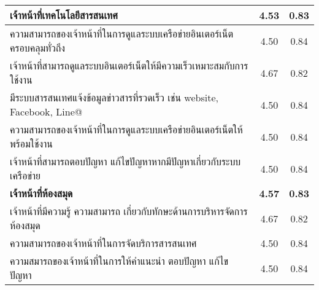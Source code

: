 \begin{longtable}{|>{\raggedright}p{9cm}|c|c|}
		\textbf{เจ้าหน้าที่เทคโนโลยีสารสนเทศ}                                                                                                                                         & \textbf{4.53}                            & \textbf{0.83}          \\ \hline
		ความสามารถของเจ้าหน้าที่ในการดูแลระบบเครือข่ายอินเตอร์เน็ตครอบคลุมทั่วถึง                                                                                                     & 4.50                            & 0.84          \\ \hline
		เจ้าหน้าที่สามารถดูแลระบบอินเตอร์เน็ตให้มีความเร็วเหมาะสมกับการใช้งาน                                                                                                         & 4.67                            & 0.82          \\ \hline
		มีระบบสารสนเทศแจ้งข้อมูลข่าวสารที่รวดเร็ว เช่น website, Facebook, Line@                                                                                                       & 4.50                            & 0.84          \\ \hline
		ความสามารถของเจ้าหน้าที่ในการดูแลระบบเครือข่ายอินเตอร์เน็ตให้พร้อมใช้งาน                                                                                                      & 4.50                            & 0.84          \\ \hline
		เจ้าหน้าที่สามารถตอบปัญหา แก้ไขปัญหาหากมีปัญหาเกี่ยวกับระบบเครือข่าย                                                                                                          & 4.50                            & 0.84          \\ \hline
		\textbf{เจ้าหน้าที่ห้องสมุด}                                                                                                                                                  & \textbf{4.57}                            & \textbf{0.83}          \\ \hline
		เจ้าหน้าที่มีความรู้ ความสามารถ เกี่ยวกับทักษะด้านการบริหารจัดการห้องสมุด                                                                                                     & 4.67                            & 0.82          \\ \hline
		ความสามารถของเจ้าหน้าที่ในการจัดบริการสารสนเทศ                                                                                                                                & 4.50                            & 0.84          \\ \hline
		ความสมารถของเจ้าหน้าที่ในการให้คำแนะนำ ตอบปัญหา แก้ไขปัญหา                                                                                                                    & 4.50                            & 0.84          \\ \hline

\end{longtable}
